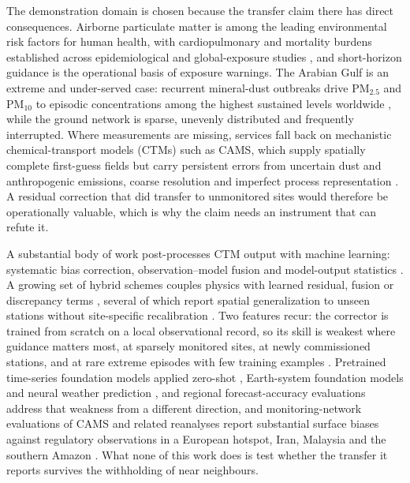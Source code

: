 \documentclass[review,times,authoryear]{elsarticle}
\newcommand*{\pmtf}{\ensuremath{\mathrm{PM_{2.5}}}}
\newcommand*{\pmten}{\ensuremath{\mathrm{PM_{10}}}}
\begin{document}
The demonstration domain is chosen because the transfer claim there has direct
consequences. Airborne particulate matter is among the leading environmental risk
factors for human health, with cardiopulmonary and mortality burdens established across
epidemiological and global-exposure studies
\citep{brunekreef2002,pope2006,brook2010,cohen2017,burnett2018,lelieveled2015,van_donkelaar2016,hammer2020},
and short-horizon guidance is the operational basis of exposure warnings. The Arabian
Gulf is an extreme and under-served case: recurrent mineral-dust outbreaks drive \pmtf{}
and \pmten{} to episodic concentrations among the highest sustained levels worldwide
\citep{draxler2001,gandham2020,gulf_dust_deposition2021,qatar_absorption2024,shahid2026,hopke2026},
while the ground network is sparse, unevenly distributed and frequently interrupted.
Where measurements are missing, services fall back on mechanistic chemical-transport
models (CTMs) such as CAMS, which supply spatially complete first-guess fields but carry
persistent errors from uncertain dust and anthropogenic emissions, coarse resolution and
imperfect process representation
\citep{inness2019,flemming2015,xu2021,liu2022,wang2024}. A residual correction that
did transfer to unmonitored sites would therefore be operationally valuable,
which is why the claim needs an instrument that can refute it.

A substantial body of work post-processes CTM output with machine learning: systematic
bias correction, observation--model fusion and model-output statistics
\citep{xu2021,lyu2019,kow2022,bertrand2023,qiu2024,sayeed2025}. A growing set of
hybrid schemes couples physics with learned residual, fusion or discrepancy terms
\citep{wang2026,dimri2026,fang2023}, several of which report spatial generalization to
unseen stations without site-specific recalibration \citep{wang2026}. Two features
recur: the corrector is trained from scratch on a local observational record, so its
skill is weakest where guidance matters most, at sparsely monitored sites, at newly
commissioned stations, and at rare extreme episodes with few training examples
\citep{sarafian2025,chelhaoui2025,aurora_china2026}. Pretrained time-series foundation
models applied zero-shot \citep{ansari2024,das2023,feng2024}, Earth-system foundation
models and neural weather prediction \citep{bodnar2025,bi2023,lam2023}, and regional
forecast-accuracy evaluations \citep{ramos2026,yeon2026} address that weakness from a
different direction, and monitoring-network evaluations of CAMS and related reanalyses
report substantial surface biases against regulatory observations in a European hotspot,
Iran, Malaysia and the southern Amazon
\citep{gualtieri2025,kaffashzadeh2024,tan2023,nassarden2025}. What none of this work
does is test whether the transfer it reports survives the withholding of near
neighbours.
\end{document}
